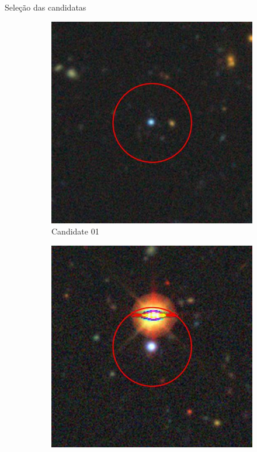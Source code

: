 \begin{frame}[c]{Seleção das candidatas}
    \begin{figure}[]
        \captionsetup{justification=centering}
        \begin{subfigure}[b]{0.13\textwidth}
            \includegraphics[width=\textwidth]{images/candidata_final/01.jpg}
            \caption{Candidate 01}
        \end{subfigure}
        \begin{subfigure}[b]{0.13\textwidth}
            \includegraphics[width=\textwidth]{images/candidata_final/02.jpg}

\end{subfigure}
\end{figure}
\end{frame}

